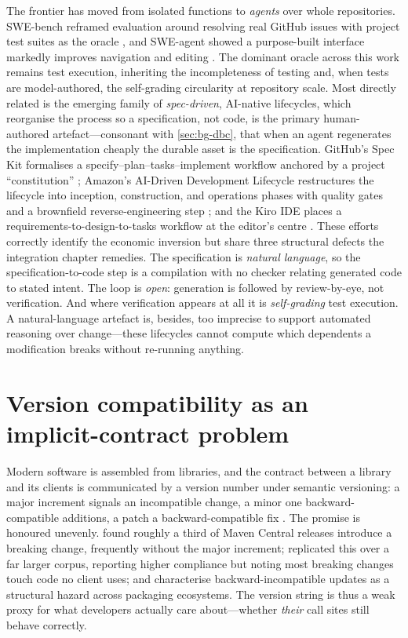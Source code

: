 The frontier has moved from isolated functions to \emph{agents} over whole
repositories. SWE-bench reframed evaluation around resolving real GitHub issues
with project test suites as the oracle \cite{jimenez2024swebench}, and SWE-agent
showed a purpose-built interface markedly improves navigation and editing
\cite{yang2024sweagent}. The dominant oracle across this work remains test
execution, inheriting the incompleteness of testing and, when tests are
model-authored, the self-grading circularity at repository scale. Most directly
related is the emerging family of \emph{spec-driven}, AI-native lifecycles, which
reorganise the process so a specification, not code, is the primary human-authored
artefact---consonant with \cref{sec:bg-dbc}, that when an agent regenerates the
implementation cheaply the durable asset is the specification. GitHub's Spec Kit
formalises a specify--plan--tasks--implement workflow anchored by a project
``constitution'' \cite{githubspeckit}; Amazon's AI-Driven Development Lifecycle
restructures the lifecycle into inception, construction, and operations phases with
quality gates and a brownfield reverse-engineering step \cite{awsaidlc}; and the
Kiro IDE places a requirements-to-design-to-tasks workflow at the editor's centre
\cite{awskiro}. These efforts correctly identify the economic inversion but share
three structural defects the integration chapter remedies. The specification is
\emph{natural language}, so the specification-to-code step is a compilation with no
checker relating generated code to stated intent. The loop is \emph{open}:
generation is followed by review-by-eye, not verification. And where verification
appears at all it is \emph{self-grading} test execution. A natural-language
artefact is, besides, too imprecise to support automated reasoning over
change---these lifecycles cannot compute which dependents a modification breaks
without re-running anything.

\section{Version compatibility as an implicit-contract problem}\label{sec:bg-evolution}

Modern software is assembled from libraries, and the contract between a library and
its clients is communicated by a version number under semantic versioning: a major
increment signals an incompatible change, a minor one backward-compatible
additions, a patch a backward-compatible fix \cite{preston2013semver}. The promise
is honoured unevenly. \citet{raemaekers2017semver} found roughly a third of Maven
Central releases introduce a breaking change, frequently without the major
increment; \citet{ochoa2022breaking} replicated this over a far larger corpus,
reporting higher compliance but noting most breaking changes touch code no client
uses; and \citet{decan2019empirical} characterise backward-incompatible updates as
a structural hazard across packaging ecosystems. The version string is thus a weak
proxy for what developers actually care about---whether \emph{their} call sites
still behave correctly.

